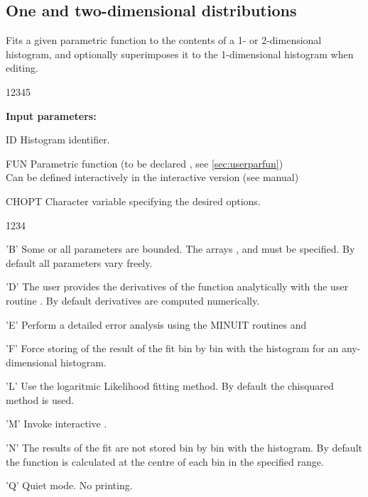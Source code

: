 \newpage%

\subsection{One and two-dimensional distributions}

 
\Action
Fits a given parametric function to the contents of a
1- or 2-dimensional histogram, and optionally superimposes
it to the 1-dimensional histogram when editing.
 
\begin{DLtt}{12345}
\item[{\rm\bf Input parameters:}]
\item[ID] Histogram identifier.
\item[FUN] Parametric function (to be declared ,
           see \ref{sec:userparfun})           \\
           Can be defined interactively in the interactive version 
           (see \PAW{} manual)
\item[CHOPT] Character variable specifying the desired options.
\begin{DLtt}{1234}
\item['B'] Some or all parameters are bounded.
           The arrays ,  and 
           must be specified.
           By default all parameters vary freely.
\item['D'] The user provides the derivatives of the function
           analytically with the user routine .
           By default derivatives are computed numerically.
\item['E'] Perform a detailed error analysis using the MINUIT routines
            and 
\item['F'] Force storing of the result of the fit bin by bin with the
           histogram for an any-dimensional histogram.
\item['L'] Use the logaritmic Likelihood fitting method.
           By default the chisquared method is used.
\item['M'] Invoke interactive .
\item['N'] The results of the fit are not stored
           bin by bin with the histogram.
           By default the function is calculated at the centre of each bin
           in the specified range.
\item['Q'] Quiet mode. No printing.

\end{DLtt}
\end{DLtt}
